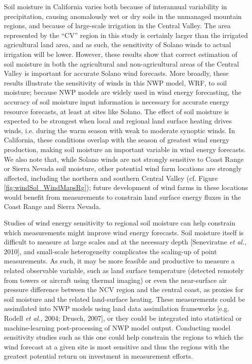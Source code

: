 Soil moisture in California varies both because of interannual variability in precipitation, causing anomalously wet or dry soils in the unmanaged mountain regions, and because of large-scale irrigation in the Central Valley.  The area represented by the ``CV'' region in this study is certainly larger than the irrigated agricultural land area, and as such, the sensitivity of Solano winds to actual irrigation will be lower.  However, these results show that correct estimation of soil moisture in both the agricultural and non-agricultural areas of the Central Valley is important for accurate Solano wind forecasts.  More broadly, these results illustrate the sensitivity of winds in this NWP model, WRF, to soil moisture; because NWP models are widely used in wind energy forecasting, the accuracy of soil moisture input information is necessary for accurate energy resource forecasts, at least at sites like Solano.  The effect of soil moisture is expected to be strongest when local and regional land surface heating drives winds, i.e. during the warm season with weak to moderate synoptic winds.  In California, these conditions overlap with the season of greatest wind energy production, making soil moisture an important variable in wind energy forecasts.  We also note that, while Solano winds are not strongly sensitive to Coast Range or Sierra Nevada soil moisture, other potential wind farm locations are strongly affected, including the northern and southern Central Valley (cf. Figure \ref{fig:windSol_WindMapsRg}); future development of wind farms in these locations would benefit from measurements to constrain land surface energy fluxes in the Coast Range and Sierra Nevada.

Studies of wind energy sensitivity to regional soil moisture can help constrain which measurements might improve wind energy forecasts.  Soil moisture itself is difficult to measure at large scales and at the necessary depth [Seneviratne \textit{et al.}, 2010], and small-scale heterogeneity complicates the scaling-up of point measurements.  As such, it may be more feasible and productive to measure a related observable variable, such as land surface temperature (detected remotely from towers or aircraft using thermal imaging) or even the near-surface air pressure difference between the NCV region and the central coast, as proxies for soil moisture and the related land-surface heating.  These measurements could be assimilated into NWP models using land data assimilation frameworks [e.g. Rodell \textit{et al.}, 2004; Drusch, 2007], or they could be integrated into statistical or machine-learning post-processing of NWP model output.  Conducting model sensitivity studies such as this one could help constrain the regions to which the wind forecast at a given site is most sensitive and thus the regions with the greatest potential return on investment in measurement efforts.

